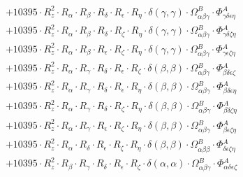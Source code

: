 \documentclass{article}
\begin{document}
\begin{subequations}
\begin{gather}
\begin{array}{c}
 \\[0.2em] 		 + 10395 \cdot R_{z}^{2} \cdot R_{\alpha{}} \cdot R_{\beta{}} \cdot R_{\delta{}} \cdot R_{\epsilon{}} \cdot R_{\eta{}} \cdot \delta{}\left(\gamma{}, \gamma{}\right) \cdot \Omega{}^{B}_{\alpha{}\beta{}\gamma{}} \cdot \Phi{}^{A}_{\gamma{}\delta{}\epsilon{}\eta{}} 
 \\[0.2em] 		 + 10395 \cdot R_{z}^{2} \cdot R_{\alpha{}} \cdot R_{\beta{}} \cdot R_{\delta{}} \cdot R_{\zeta{}} \cdot R_{\eta{}} \cdot \delta{}\left(\gamma{}, \gamma{}\right) \cdot \Omega{}^{B}_{\alpha{}\beta{}\gamma{}} \cdot \Phi{}^{A}_{\gamma{}\delta{}\zeta{}\eta{}} 
 \\[0.2em] 		 + 10395 \cdot R_{z}^{2} \cdot R_{\alpha{}} \cdot R_{\beta{}} \cdot R_{\epsilon{}} \cdot R_{\zeta{}} \cdot R_{\eta{}} \cdot \delta{}\left(\gamma{}, \gamma{}\right) \cdot \Omega{}^{B}_{\alpha{}\beta{}\gamma{}} \cdot \Phi{}^{A}_{\gamma{}\epsilon{}\zeta{}\eta{}} 
 \\[0.2em] 		 + 10395 \cdot R_{z}^{2} \cdot R_{\alpha{}} \cdot R_{\gamma{}} \cdot R_{\delta{}} \cdot R_{\epsilon{}} \cdot R_{\zeta{}} \cdot \delta{}\left(\beta{}, \beta{}\right) \cdot \Omega{}^{B}_{\alpha{}\beta{}\gamma{}} \cdot \Phi{}^{A}_{\beta{}\delta{}\epsilon{}\zeta{}} 
 \\[0.2em] 		 + 10395 \cdot R_{z}^{2} \cdot R_{\alpha{}} \cdot R_{\gamma{}} \cdot R_{\delta{}} \cdot R_{\epsilon{}} \cdot R_{\eta{}} \cdot \delta{}\left(\beta{}, \beta{}\right) \cdot \Omega{}^{B}_{\alpha{}\beta{}\gamma{}} \cdot \Phi{}^{A}_{\beta{}\delta{}\epsilon{}\eta{}} 
 \\[0.2em] 		 + 10395 \cdot R_{z}^{2} \cdot R_{\alpha{}} \cdot R_{\gamma{}} \cdot R_{\delta{}} \cdot R_{\zeta{}} \cdot R_{\eta{}} \cdot \delta{}\left(\beta{}, \beta{}\right) \cdot \Omega{}^{B}_{\alpha{}\beta{}\gamma{}} \cdot \Phi{}^{A}_{\beta{}\delta{}\zeta{}\eta{}} 
 \\[0.2em] 		 + 10395 \cdot R_{z}^{2} \cdot R_{\alpha{}} \cdot R_{\gamma{}} \cdot R_{\epsilon{}} \cdot R_{\zeta{}} \cdot R_{\eta{}} \cdot \delta{}\left(\beta{}, \beta{}\right) \cdot \Omega{}^{B}_{\alpha{}\beta{}\gamma{}} \cdot \Phi{}^{A}_{\beta{}\epsilon{}\zeta{}\eta{}} 
 \\[0.2em] 		 + 10395 \cdot R_{z}^{2} \cdot R_{\alpha{}} \cdot R_{\delta{}} \cdot R_{\epsilon{}} \cdot R_{\zeta{}} \cdot R_{\eta{}} \cdot \delta{}\left(\beta{}, \beta{}\right) \cdot \Omega{}^{B}_{\alpha{}\beta{}\beta{}} \cdot \Phi{}^{A}_{\delta{}\epsilon{}\zeta{}\eta{}} 
 \\[0.2em] 		 + 10395 \cdot R_{z}^{2} \cdot R_{\beta{}} \cdot R_{\gamma{}} \cdot R_{\delta{}} \cdot R_{\epsilon{}} \cdot R_{\zeta{}} \cdot \delta{}\left(\alpha{}, \alpha{}\right) \cdot \Omega{}^{B}_{\alpha{}\beta{}\gamma{}} \cdot \Phi{}^{A}_{\alpha{}\delta{}\epsilon{}\zeta{}} 

\end{array}
\end{gather}
\end{subequations}
\end{document}
